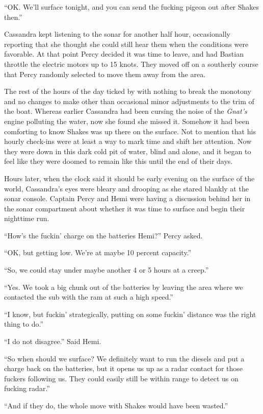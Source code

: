 \documentclass[
]{scrbook}
\begin{document}
``OK. We'll surface tonight, and you can send the fucking pigeon out
after Shakes then.''

Cassandra kept listening to the sonar for another half hour,
occasionally reporting that she thought she could still hear them when
the conditions were favorable. At that point Percy decided it was time
to leave, and had Bastian throttle the electric motors up to 15 knots.
They moved off on a southerly course that Percy randomly selected to
move them away from the area.

The rest of the hours of the day ticked by with nothing to break the
monotony and no changes to make other than occasional minor adjustments
to the trim of the boat. Whereas earlier Cassandra had been cursing the
noise of the \emph{Gnat's} engine polluting the water, now she found she
missed it. Somehow it had been comforting to know Shakes was up there on
the surface. Not to mention that his hourly check-ins were at least a
way to mark time and shift her attention. Now they were down in this
dark cold pit of water, blind and alone, and it began to feel like they
were doomed to remain like this until the end of their days.

Hours later, when the clock said it should be early evening on the
surface of the world, Cassandra's eyes were bleary and drooping as she
stared blankly at the sonar console. Captain Percy and Hemi were having
a discussion behind her in the sonar compartment about whether it was
time to surface and begin their nighttime run.

``How's the fuckin' charge on the batteries Hemi?'' Percy asked.

``OK, but getting low. We're at maybe 10 percent capacity.''

``So, we could stay under maybe another 4 or 5 hours at a creep.''

``Yes. We took a big chunk out of the batteries by leaving the area
where we contacted the sub with the ram at such a high speed.''

``I know, but fuckin' strategically, putting on some fuckin' distance
was the right thing to do.''

``I do not disagree.'' Said Hemi.

``So when should we surface? We definitely want to run the diesels and
put a charge back on the batteries, but it opens us up as a radar
contact for those fuckers following us. They could easily still be
within range to detect us on fucking radar.''

``And if they do, the whole move with Shakes would have been wasted.''
\end{document}
